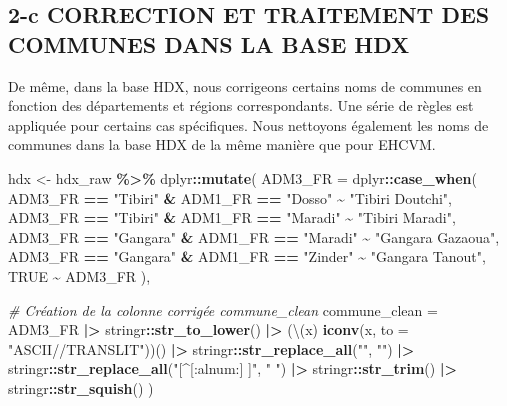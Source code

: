 \documentclass[
]{article}
\newenvironment{Shaded}{\begin{snugshade}}{\end{snugshade}}
\newcommand{\AttributeTok}[1]{\textcolor[rgb]{0.13,0.29,0.53}{#1}}
\newcommand{\CommentTok}[1]{\textcolor[rgb]{0.56,0.35,0.01}{\textit{#1}}}
\newcommand{\ConstantTok}[1]{\textcolor[rgb]{0.56,0.35,0.01}{#1}}
\newcommand{\FunctionTok}[1]{\textcolor[rgb]{0.13,0.29,0.53}{\textbf{#1}}}
\newcommand{\NormalTok}[1]{#1}
\newcommand{\OtherTok}[1]{\textcolor[rgb]{0.56,0.35,0.01}{#1}}
\newcommand{\SpecialCharTok}[1]{\textcolor[rgb]{0.81,0.36,0.00}{\textbf{#1}}}
\newcommand{\StringTok}[1]{\textcolor[rgb]{0.31,0.60,0.02}{#1}}
\begin{document}
\subsection{2-c CORRECTION ET TRAITEMENT DES COMMUNES DANS LA BASE
HDX}\label{c-correction-et-traitement-des-communes-dans-la-base-hdx}

De même, dans la base HDX, nous corrigeons certains noms de communes en
fonction des départements et régions correspondants. Une série de règles
est appliquée pour certains cas spécifiques. Nous nettoyons également
les noms de communes dans la base HDX de la même manière que pour EHCVM.

\begin{Shaded}
\begin{Highlighting}[]
\NormalTok{hdx }\OtherTok{\textless{}{-}}\NormalTok{ hdx\_raw }\SpecialCharTok{\%\textgreater{}\%}
\NormalTok{  dplyr}\SpecialCharTok{::}\FunctionTok{mutate}\NormalTok{(}
    \AttributeTok{ADM3\_FR =}\NormalTok{ dplyr}\SpecialCharTok{::}\FunctionTok{case\_when}\NormalTok{(}
\NormalTok{      ADM3\_FR }\SpecialCharTok{==} 
        \StringTok{"Tibiri"} \SpecialCharTok{\&}\NormalTok{ ADM1\_FR }\SpecialCharTok{==} \StringTok{"Dosso"} \SpecialCharTok{\textasciitilde{}} \StringTok{"Tibiri Doutchi"}\NormalTok{,}
\NormalTok{      ADM3\_FR }\SpecialCharTok{==} 
        \StringTok{"Tibiri"} \SpecialCharTok{\&}\NormalTok{ ADM1\_FR }\SpecialCharTok{==} \StringTok{"Maradi"} \SpecialCharTok{\textasciitilde{}} \StringTok{"Tibiri Maradi"}\NormalTok{,}
\NormalTok{      ADM3\_FR }\SpecialCharTok{==} 
        \StringTok{"Gangara"} \SpecialCharTok{\&}\NormalTok{ ADM1\_FR }\SpecialCharTok{==} \StringTok{"Maradi"} \SpecialCharTok{\textasciitilde{}} \StringTok{"Gangara Gazaoua"}\NormalTok{,}
\NormalTok{      ADM3\_FR }\SpecialCharTok{==} 
        \StringTok{"Gangara"} \SpecialCharTok{\&}\NormalTok{ ADM1\_FR }\SpecialCharTok{==} \StringTok{"Zinder"} \SpecialCharTok{\textasciitilde{}} \StringTok{"Gangara Tanout"}\NormalTok{,}
      \ConstantTok{TRUE} \SpecialCharTok{\textasciitilde{}}\NormalTok{ ADM3\_FR}
\NormalTok{    ),}
    
    \CommentTok{\# Création de la colonne corrigée commune\_clean}
    \AttributeTok{commune\_clean =}\NormalTok{ ADM3\_FR }\SpecialCharTok{|\textgreater{}}
\NormalTok{      stringr}\SpecialCharTok{::}\FunctionTok{str\_to\_lower}\NormalTok{() }\SpecialCharTok{|\textgreater{}}
\NormalTok{      (\textbackslash{}(x) }\FunctionTok{iconv}\NormalTok{(x, }\AttributeTok{to =} \StringTok{"ASCII//TRANSLIT"}\NormalTok{))() }\SpecialCharTok{|\textgreater{}}
\NormalTok{      stringr}\SpecialCharTok{::}\FunctionTok{str\_replace\_all}\NormalTok{(}\StringTok{"\textquotesingle{}"}\NormalTok{, }\StringTok{""}\NormalTok{) }\SpecialCharTok{|\textgreater{}}
\NormalTok{      stringr}\SpecialCharTok{::}\FunctionTok{str\_replace\_all}\NormalTok{(}\StringTok{"[\^{}[:alnum:] ]"}\NormalTok{, }\StringTok{" "}\NormalTok{) }\SpecialCharTok{|\textgreater{}}
\NormalTok{      stringr}\SpecialCharTok{::}\FunctionTok{str\_trim}\NormalTok{() }\SpecialCharTok{|\textgreater{}}
\NormalTok{      stringr}\SpecialCharTok{::}\FunctionTok{str\_squish}\NormalTok{()}
\NormalTok{  )}
\end{Highlighting}
\end{Shaded}
\end{document}
